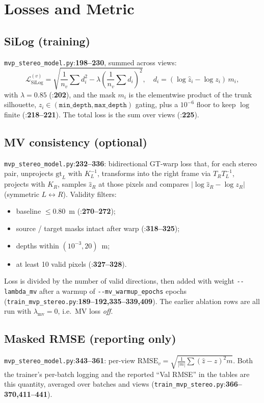 \documentclass[11pt]{article}
\newcommand{\fref}[2]{\texttt{\textcolor{filegray}{#1}}:\textbf{#2}}
\begin{document}
\section{Losses and Metric}

\subsection{SiLog (training)}
\fref{mvp\_stereo\_model.py}{198--230}, summed across views:
\[
  \mathcal{L}_{\text{SiLog}}^{(v)} =
   \sqrt{\frac{1}{n_v}\!\!\sum d_i^2
         - \lambda\!\left(\frac{1}{n_v}\!\!\sum d_i\right)^{\!2}},
   \quad d_i = (\log\hat z_i - \log z_i)\,m_i,
\]
with $\lambda=0.85$
(\fref{}{202}), and the mask $m_i$ is the elementwise product of the
trunk silhouette, $z_i \in (\texttt{min\_depth},\texttt{max\_depth})$
gating, plus a $10^{-6}$ floor to keep $\log$ finite
(\fref{}{218--221}). The total loss is the sum over views
(\fref{}{225}).

\subsection{MV consistency (optional)}
\fref{mvp\_stereo\_model.py}{232--336}: bidirectional GT-warp loss that,
for each stereo pair, unprojects $\text{gt}_L$ with $K_L^{-1}$, transforms
into the right frame via $T_R T_L^{-1}$, projects with $K_R$, samples
$\hat z_R$ at those pixels and compares $|\log \hat z_R - \log z_R|$
(symmetric $L\!\leftrightarrow\!R$). Validity filters:
\begin{itemize}[leftmargin=2em]
  \item baseline $\leq 0.80$~m (\fref{}{270--272});
  \item source / target masks intact after warp (\fref{}{318--325});
  \item depths within $(10^{-3},20)$~m;
  \item at least 10 valid pixels (\fref{}{327--328}).
\end{itemize}
Loss is divided by the number of valid directions, then added with
weight \texttt{-{}-lambda\_mv} after a warmup of
\texttt{-{}-mv\_warmup\_epochs} epochs
(\fref{train\_mvp\_stereo.py}{189--192,335--339,409}). The earlier
ablation rows are all run with $\lambda_{\text{mv}}=0$, i.e.\ MV loss
\emph{off}.

\subsection{Masked RMSE (reporting only)}
\fref{mvp\_stereo\_model.py}{343--361}: per-view
$\mathrm{RMSE}_v = \sqrt{\frac{1}{|m|}\sum (\hat z - z)^2 m}$. Both the
trainer's per-batch logging and the reported ``Val RMSE'' in the tables
are this quantity, averaged over batches and views
(\fref{train\_mvp\_stereo.py}{366--370,411--441}).
\end{document}
